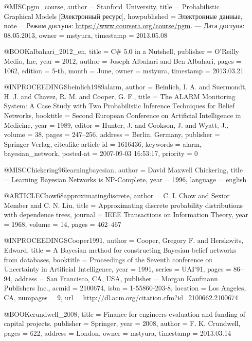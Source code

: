 
@MISC{pgm_course,
  author = {\mbox{Stanford University}},
  title = {Probabilistic Graphical Models [Электронный ресурс]},
  howpublished = {Электронные данные},
  note = {Режим доступа: \url{https://www.coursera.org/course/pgm}. --- Дата
	доступа: 08.05.2013},
  owner = {mstyura},
  timestamp = {2013.05.08}
}

@BOOK{albahari_2012_en,
  title = {C\# 5.0 in a Nutshell},
  publisher = {O’Reilly Media, Inc},
  year = {2012},
  author = {Joseph Albahari and Ben Albahari},
  pages = {1062},
  edition = {5-th},
  month = {June},
  owner = {mstyura},
  timestamp = {2013.03.21}
}

@INPROCEEDINGS{beinlich1989alarm,
  author = {Beinlich, I. A. and Suermondt, H. J. and Chavez, R. M. and Cooper,
	G. F.},
  title = {{The ALARM Monitoring System: A Case Study with Two Probabilistic
	Inference Techniques for Belief Networks}},
  booktitle = {Second European Conference on Artificial Intelligence in Medicine},
  year = {1989},
  editor = {Hunter, J. and Cookson, J. and Wyatt, J.},
  volume = {38},
  pages = {247--256},
  address = {Berlin, Germany},
  publisher = {Springer-Verlag},
  citeulike-article-id = {1616436},
  keywords = {alarm, bayesian\_network},
  posted-at = {2007-09-03 16:53:17},
  priority = {0}
}

@MISC{Chickering96learningbayesian,
  author = {David Maxwell Chickering},
  title = {Learning Bayesian Networks is NP-Complete},
  year = {1996},
  language = {english}
}

@ARTICLE{Chow68approximatingdiscrete,
  author = {C. I. Chow and Sexior Member and C. N. Liu},
  title = {Approximating discrete probability distributions with dependence
	trees},
  journal = {IEEE Transactions on Information Theory},
  year = {1968},
  volume = {14},
  pages = {462--467}
}

@INPROCEEDINGS{Cooper1991,
  author = {Cooper, Gregory F. and Herskovits, Edward},
  title = {A Bayesian method for constructing Bayesian belief networks from
	databases},
  booktitle = {Proceedings of the Seventh conference on Uncertainty in Artificial
	Intelligence},
  year = {1991},
  series = {UAI'91},
  pages = {86--94},
  address = {San Francisco, CA, USA},
  publisher = {Morgan Kaufmann Publishers Inc.},
  acmid = {2100674},
  isbn = {1-55860-203-8},
  location = {Los Angeles, CA},
  numpages = {9},
  url = {http://dl.acm.org/citation.cfm?id=2100662.2100674}
}

@BOOK{crundwell_2008,
  title = {Finance for engineers evaluation and funding of capital projects},
  publisher = {Springer},
  year = {2008},
  author = {F. K. Crundwell},
  pages = {622},
  address = {London},
  owner = {mstyura},
  timestamp = {2013.03.14}
}

